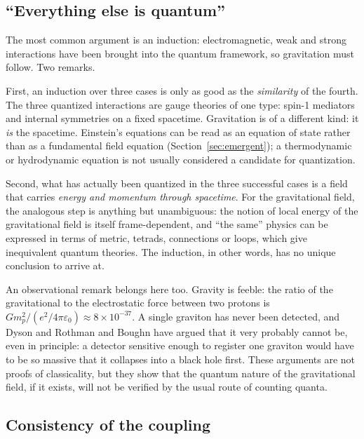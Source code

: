 \subsection{``Everything else is quantum''}

The most common argument is an induction: electromagnetic, weak and
strong interactions have been brought into the quantum framework, so
gravitation must follow. Two remarks.

First, an induction over three cases is only as good as the
\emph{similarity} of the fourth. The three quantized interactions are
gauge theories of one type: spin-1 mediators and internal symmetries on a
fixed spacetime. Gravitation is of a different kind: it \emph{is} the
spacetime. Einstein's equations can be read as an equation of state
rather than as a fundamental field equation (Section~\ref{sec:emergent});
a thermodynamic or hydrodynamic equation is not usually considered a
candidate for quantization.

Second, what has actually been quantized in the three successful cases
is a field that carries \emph{energy and momentum through spacetime}. For
the gravitational field, the analogous step is anything but unambiguous:
the notion of local energy of the gravitational field is itself
frame-dependent, and ``the same'' physics can be expressed in terms of
metric, tetrads, connections or loops, which give inequivalent quantum
theories. The induction, in other words, has no unique conclusion to
arrive at.

An observational remark belongs here too. Gravity is feeble: the ratio of
the gravitational to the electrostatic force between two protons is
$G m_p^2 \big/ (e^2/4\pi\varepsilon_0)\approx 8\times 10^{-37}$. A
single graviton has never been detected, and Dyson \cite{qg:dyson} and
Rothman and Boughn \cite{qg:rothman} have argued that it very probably
cannot be, even in principle: a detector sensitive enough to register one
graviton would have to be so massive that it collapses into a black hole
first. These arguments are not proofs of classicality, but they show that
the quantum nature of the gravitational field, if it exists, will not be
verified by the usual route of counting quanta.

\subsection{Consistency of the coupling}

